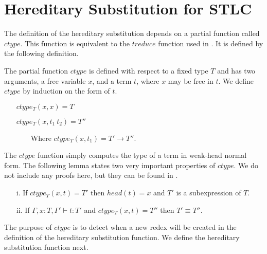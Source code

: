 \section{Hereditary Substitution for STLC}
\label{sec:hereditary_substitution_for_stlc}
The definition of the hereditary substitution depends on a partial
function called $ctype$.  This function is equivalent to the $treduce$
function used in \cite{Watkins:2004}. It is defined by the following
definition.
\begin{definition}
  \label{def:ctype_stlc}
  The partial function $ctype$ is defined with respect to a fixed type $T$
  and has two arguments, a free variable $x$, and a term $t$, where $x$
  may be free in $t$.  We define $ctype$ by induction on the form of $t$.
  \begin{itemize}
  \item[] $ctype_T(x,x) = T$
  \item[] $ctype_T(x,t_1\ t_2) = T''$
  \item[] \ \ \ \ Where $ctype_T(x,t_1) = T' \to T''$.
  \end{itemize}
\end{definition}
\noindent
The $ctype$ function simply computes the type of a term in weak-head normal form.
The following lemma states two very important properties of $ctype$.  We
do not include any proofs here, but they can be found in \cite{Eades:2011}.
\begin{lemma}
  \label{lemma:ctype_props_stlc}
  \begin{itemize}
  \item[i.] If $ctype_T(x,t) = T'$ then $head(t) = x$ and $T'$ 
    is a subexpression of $T$.
    
  \item[ii.] If $\Gamma,x:T,\Gamma' \vdash t:T'$ and $ctype_T(x,t) = T''$ then
    $T' \equiv T''$.   
  \end{itemize}
\end{lemma}
\noindent
The purpose of $ctype$ is to detect when a new redex will be created in the
definition of the hereditary substitution function. We define the
hereditary substitution function next.
